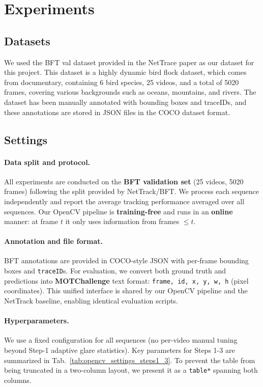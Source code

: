 \section{Experiments}
\subsection{Datasets}

We used the BFT val dataset provided in the NetTrace paper as our dataset for this project. This dataset is a highly dynamic bird flock dataset, which comes from documentary,  containing 6 bird species, 25 videos, and a total of 5020 frames, covering various backgrounds such as oceans, mountains, and rivers. The dataset has been manually annotated with bounding boxes and traceIDs, and these annotations are stored in JSON files in the COCO dataset format.

\subsection{Settings}
\label{sec:exp_settings}

\paragraph{Data split and protocol.}
All experiments are conducted on the \textbf{BFT validation set} (25 videos, 5020 frames) following the split provided by NetTrack/BFT. We process each sequence independently and report the average tracking performance averaged over all sequences. Our OpenCV pipeline is \textbf{training-free} and runs in an \textbf{online} manner: at frame $t$ it only uses information from frames $\le t$.

\paragraph{Annotation and file format.}
BFT annotations are provided in COCO-style JSON with per-frame bounding boxes and \texttt{traceID}s. For evaluation, we convert both ground truth and predictions into \textbf{MOTChallenge} text format: \texttt{frame, id, x, y, w, h} (pixel coordinates). This unified interface is shared by our OpenCV pipeline and the NetTrack baseline, enabling identical evaluation scripts.

\paragraph{Hyperparameters.}
We use a fixed configuration for all sequences (no per-video manual tuning beyond Step-1 adaptive glare statistics). Key parameters for Steps 1-3 are summarized in Tab.~\ref{tab:opencv_settings_steps1_3}. To prevent the table from being truncated in a two-column layout, we present it as a \texttt{table*} spanning both columns.

